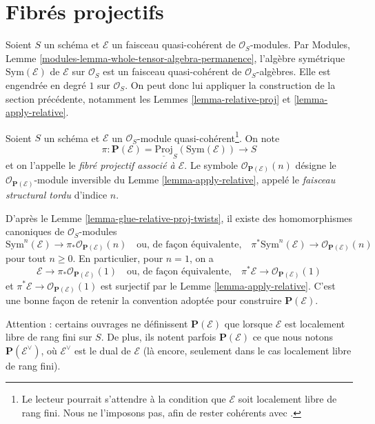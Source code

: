 \section{Fibrés projectifs}
\label{section-projective-bundle}

\noindent
Soient $S$ un schéma et $\mathcal{E}$ un faisceau quasi-cohérent de
$\mathcal{O}_S$-modules. Par Modules,
Lemme \ref{modules-lemma-whole-tensor-algebra-permanence}, l'algèbre
symétrique $\text{Sym}(\mathcal{E})$ de $\mathcal{E}$ sur $\mathcal{O}_S$
est un faisceau quasi-cohérent de $\mathcal{O}_S$-algèbres. Elle est
engendrée en degré $1$ sur $\mathcal{O}_S$. On peut donc lui appliquer la
construction de la section précédente, notamment les Lemmes
\ref{lemma-relative-proj} et \ref{lemma-apply-relative}.

\begin{definition}
\label{definition-projective-bundle}
Soient $S$ un schéma et $\mathcal{E}$ un $\mathcal{O}_S$-module
quasi-cohérent\footnote{Le lecteur pourrait s'attendre à la condition que
$\mathcal{E}$ soit localement libre de rang fini. Nous ne l'imposons pas,
afin de rester cohérents avec \cite[II, Definition 4.1.1]{EGA}.}.
On note
$$
\pi :
\mathbf{P}(\mathcal{E}) = \underline{\text{Proj}}_S(\text{Sym}(\mathcal{E}))
\longrightarrow
S
$$
et on l'appelle le {\it fibré projectif associé à $\mathcal{E}$}.
Le symbole $\mathcal{O}_{\mathbf{P}(\mathcal{E})}(n)$ désigne le
$\mathcal{O}_{\mathbf{P}(\mathcal{E})}$-module inversible du
Lemme \ref{lemma-apply-relative}, appelé le {\it faisceau structural tordu}
d'indice $n$.
\end{definition}

\noindent
D'après le Lemme \ref{lemma-glue-relative-proj-twists}, il existe des
homomorphismes canoniques de $\mathcal{O}_S$-modules
$$
\text{Sym}^n(\mathcal{E})
\longrightarrow
\pi_*\mathcal{O}_{\mathbf{P}(\mathcal{E})}(n)
\quad\text{ou, de façon équivalente,}\quad
\pi^*\text{Sym}^n(\mathcal{E})
\longrightarrow
\mathcal{O}_{\mathbf{P}(\mathcal{E})}(n)
$$
pour tout $n \geq 0$. En particulier, pour $n = 1$, on a
$$
\mathcal{E}
\longrightarrow
\pi_*\mathcal{O}_{\mathbf{P}(\mathcal{E})}(1)
\quad\text{ou, de façon équivalente,}\quad
\pi^*\mathcal{E}
\longrightarrow
\mathcal{O}_{\mathbf{P}(\mathcal{E})}(1)
$$
et $\pi^*\mathcal{E} \to \mathcal{O}_{\mathbf{P}(\mathcal{E})}(1)$ est
surjectif par le Lemme \ref{lemma-apply-relative}. C'est une bonne façon
de retenir la convention adoptée pour construire $\mathbf{P}(\mathcal{E})$.

\medskip\noindent
Attention : certains ouvrages ne définissent $\mathbf{P}(\mathcal{E})$
que lorsque $\mathcal{E}$ est localement libre de rang fini sur $S$.
De plus, ils notent parfois $\mathbf{P}(\mathcal{E})$ ce que nous notons
$\mathbf{P}(\mathcal{E}^\vee)$, où $\mathcal{E}^\vee$ est le dual de
$\mathcal{E}$ (là encore, seulement dans le cas localement libre de rang
fini).

